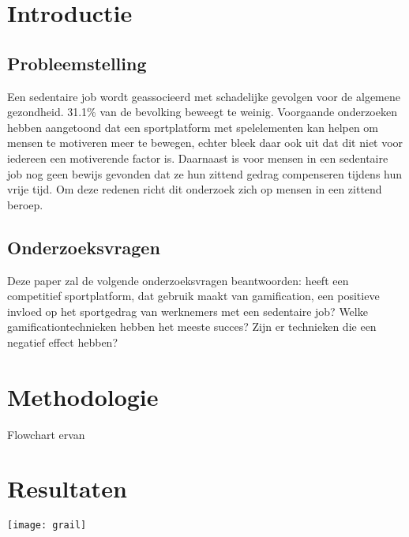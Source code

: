 \documentclass[a0,portrait]{hogent-poster}
\begin{document}
\begin{multicols}{2} %

\section{Introductie}

\subsection{Probleemstelling}
Een sedentaire job wordt geassocieerd met schadelijke gevolgen voor de algemene gezondheid. 31.1\% van de bevolking beweegt te weinig. Voorgaande onderzoeken hebben aangetoond dat een sportplatform met spelelementen kan helpen om mensen te motiveren meer te bewegen, echter bleek daar ook uit dat dit niet voor iedereen een motiverende factor is. Daarnaast is voor mensen in een sedentaire job nog geen bewijs gevonden dat ze hun zittend gedrag compenseren tijdens hun vrije tijd. Om deze redenen richt dit onderzoek zich op mensen in een zittend beroep.

\subsection{Onderzoeksvragen}

Deze paper zal de volgende onderzoeksvragen beantwoorden: heeft een competitief sportplatform, dat gebruik maakt van gamification, een positieve invloed op het sportgedrag van werknemers met een sedentaire job? Welke gamificationtechnieken hebben het meeste succes? Zijn er technieken die een negatief effect hebben?

\section{Methodologie}

Flowchart ervan

\section{Resultaten}

\begin{center}
  \captionsetup{type=figure}
  \texttt{[image: grail]}
\end{center}


\end{multicols}
\end{document}
